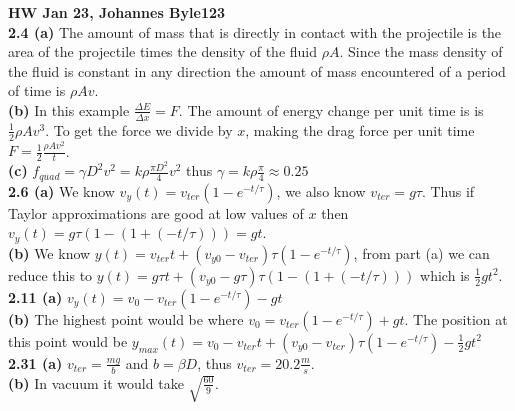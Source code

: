 \documentclass[english]{article}
\begin{document}
\textbf{HW Jan 23, Johannes Byle123}\\

\noindent
\textbf{2.4 (a)} The amount of mass that is directly in contact with the projectile is the area of the projectile times the density of the fluid $\rho A$. Since the mass density of the fluid is constant in any direction the amount of mass encountered of a period of time is $\rho Av$.\\

\textbf{(b)} In this example $\frac{\Delta E}{\Delta x}=F$. The amount of energy change per unit time is is $\frac{1}{2}\rho Av^3$. To get the force we divide by $x$, making the drag force per unit time $F=\frac{1}{2}\frac{\rho Av^2}{t}$. \\

\textbf{(c)} $f_{quad}=\gamma D^2v^2=k\rho \frac{\pi D^2}{4}v^2$ thus $\gamma=k\rho \frac{\pi}{4}\approx 0.25$\\

\noindent
\textbf{2.6 (a)} We know $v_y(t)=v_{ter}(1-e^{-t/\tau})$, we also know $v_{ter}=g\tau$. Thus if Taylor approximations are good at low values of $x$ then $v_y(t)=g\tau(1-(1+(-t/\tau)))=gt$.\\

\textbf{(b)} We know $y(t)=v_{ter}t+(v_{y0}-v_{ter})\tau(1-e^{-t/\tau})$, from part (a) we can reduce this to $y(t)=g\tau t+(v_{y0}-g\tau)\tau(1-(1+(-t/\tau)))$ which is $\frac{1}{2}gt^2$.\\

\noindent
\textbf{2.11 (a)} $v_y(t)=v_0-v_{ter}(1-e^{-t/\tau})-gt$\\

\textbf{(b)} The highest point would be where $v_0=v_{ter}(1-e^{-t/\tau})+gt$. The position at this point would be $y_{max}(t)=v_0-v_{ter}t+(v_{y0}-v_{ter})\tau(1-e^{-t/\tau})-\frac{1}{2}gt^2$\\

\noindent
\textbf{2.31 (a)} $v_{ter}=\frac{mg}{b}$ and $b=\beta D$, thus $v_{ter}=20.2\frac{m}{s}$.\\

\textbf{(b)} In vacuum it would take $\sqrt{\frac{60}{9}}$.
\end{document}
